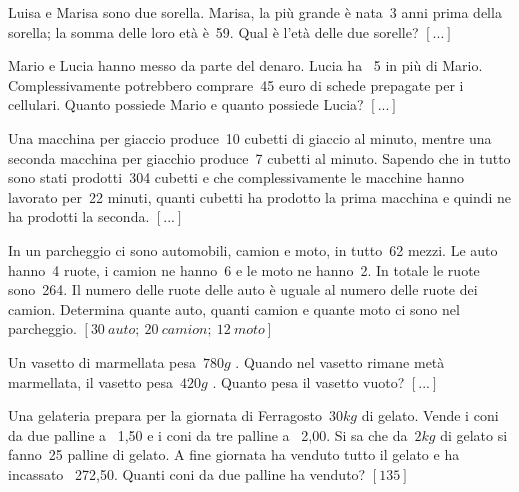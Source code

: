 \begin{multicols}{2}
\begin{esercizio}
 \label{ese:22.97}
Luisa e Marisa sono due sorella. Marisa, la più grande è nata~3 anni
prima della sorella; la somma delle loro età è~59. Qual è
l'età delle due sorelle?
\hfill $\left[...\right]$
\end{esercizio}

\begin{esercizio}
 \label{ese:22.98}
Mario e Lucia hanno messo da parte del denaro. Lucia ha {\officialeuro}~5
in più di Mario. Complessivamente potrebbero comprare~45 euro di
schede prepagate per i cellulari. Quanto possiede Mario e quanto
possiede Lucia?
\hfill $\left[...\right]$
\end{esercizio}

\begin{esercizio}
 \label{ese:22.99}
Una macchina per giaccio produce~10 cubetti di giaccio al minuto, mentre
una seconda macchina per giacchio produce~7 cubetti al minuto. Sapendo
che in tutto sono stati prodotti~304 cubetti e che complessivamente le
macchine hanno lavorato per~22 minuti, quanti cubetti ha prodotto la
prima macchina e quindi ne ha prodotti la seconda.
\hfill $\left[...\right]$
\end{esercizio}

\begin{esercizio}[\Ast]
 \label{ese:22.100}
In un parcheggio ci sono automobili, camion e moto, in tutto~62 mezzi.
Le auto hanno~4 ruote, i camion ne hanno~6 e le moto ne hanno~2.
In totale le ruote sono~264. Il numero delle ruote delle auto è uguale
al numero delle ruote dei camion. Determina quante auto, quanti camion
e quante moto ci sono nel parcheggio.
\hfill $\left[30~auto;~20~camion;~12~moto\right]$
\end{esercizio}

\begin{esercizio}
 \label{ese:22.101}
 Un vasetto di marmellata pesa~$780\unit{g}$ . Quando nel vasetto rimane
metà marmellata, il vasetto pesa~$420\unit{g}$ . Quanto pesa il vasetto vuoto?
\hfill $\left[...\right]$
\end{esercizio}


\begin{esercizio}[\Ast]
 \label{ese:22.102}
Una gelateria prepara per la giornata di Ferragosto~$30\unit{kg}$ di
gelato. Vende i coni da due palline a {\officialeuro}~1,50 e i coni da tre
palline a {\officialeuro}~2,00. Si sa che da~$2\unit{kg}$ di gelato si fanno~25
palline di gelato. A fine giornata ha venduto tutto il gelato e ha
incassato {\officialeuro}~272,50. Quanti coni da due palline ha venduto?
\hfill $\left[135\right]$
\end{esercizio}


\end{multicols}
